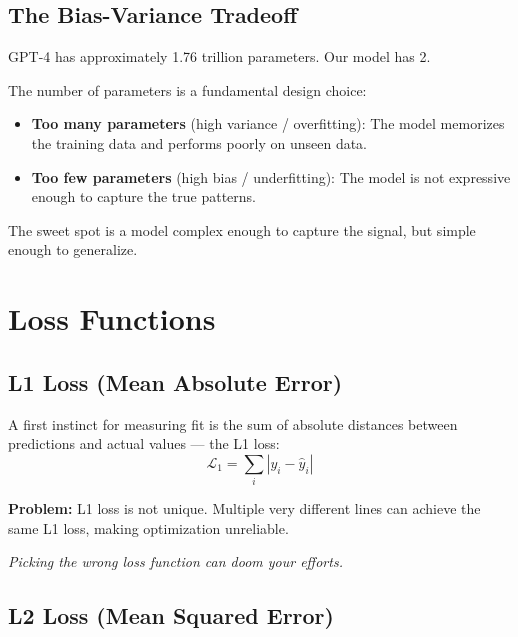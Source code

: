\documentclass[12pt]{article}
\begin{document}
\subsection{The Bias-Variance Tradeoff}

\begin{notebox}
GPT-4 has approximately 1.76 trillion parameters. Our model has 2.
\end{notebox}

The number of parameters is a fundamental design choice:
\begin{itemize}
  \item \textbf{Too many parameters} (high variance / overfitting): The model memorizes the training data and performs poorly on unseen data.
  \item \textbf{Too few parameters} (high bias / underfitting): The model is not expressive enough to capture the true patterns.
\end{itemize}

The sweet spot is a model complex enough to capture the signal, but simple enough to generalize.

\section{Loss Functions}

\subsection{L1 Loss (Mean Absolute Error)}

A first instinct for measuring fit is the sum of absolute distances between predictions and actual values --- the L1 loss:
\[
\mathcal{L}_1 = \sum_i |y_i - \hat{y}_i|
\]

\textbf{Problem:} L1 loss is not unique. Multiple very different lines can achieve the same L1 loss, making optimization unreliable.

\begin{takeawaybox}
\textit{Picking the wrong loss function can doom your efforts.}
\end{takeawaybox}

\subsection{L2 Loss (Mean Squared Error)}
\end{document}
